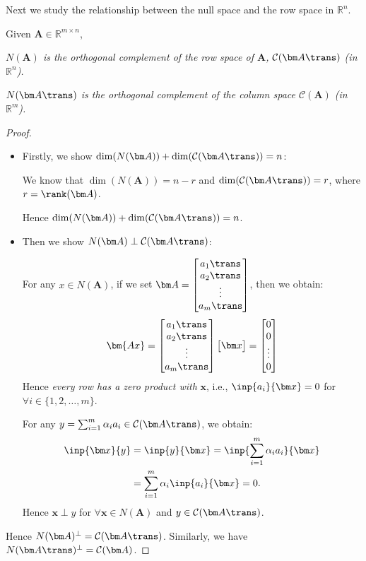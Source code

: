 Next we study the relationship between the null space and the row space in $\mathbb{R}^n$.
\begin{theorem} Given $\bm A\in\mathbb{R}^{m\times n}$,

\emph{$N(\bm A)$ is the orthogonal complement of the row space of $\bm A$, $\mathcal{C}(\bm A\trans)$ (in $\mathbb{R}^{n}$).}

\emph{$N(\bm A\trans)$ is the orthogonal complement of the column space $\mathcal{C}(\bm A)$ (in $\mathbb{R}^{m}$).}
\end{theorem}
\begin{proof}
\begin{itemize}
\item
Firstly, we show $\dim(N(\bm A))+\dim(\mathcal{C}(\bm A\trans))=n$:

We know that $\dim(N(\bm A))=n-r$ and $\dim(\mathcal{C}(\bm A\trans)) = r$, where $r=\rank(\bm A)$.

Hence $\dim(N(\bm A))+\dim(\mathcal{C}(\bm A\trans))=n$.
\item
Then we show $N(\bm A)\perp \mathcal{C}(\bm A\trans)$:

For any $x\in N(\bm A)$, if we set $\bm A=\begin{bmatrix}
a_1\trans\\a_2\trans\\\vdots\\a_m\trans
\end{bmatrix}$, then we obtain:
\[
\bm{Ax}=\begin{bmatrix}
a_1\trans\\a_2\trans\\\vdots\\a_m\trans
\end{bmatrix}\begin{bmatrix}
\bm x
\end{bmatrix}=\begin{bmatrix}
0\\0\\\vdots\\0
\end{bmatrix}
\]
Hence \textit{every row has a zero product with} $\bm x$, i.e., $\inp{a_i}{\bm x}=0$ for $\forall i\in\{1,2,\dots,m\}$.

For any $y=\sum_{i=1}^m\alpha_ia_i\in \mathcal{C}	(\bm A\trans)$, we obtain:
\[
\begin{aligned}
\inp{\bm x}{y}&=\inp{y}{\bm x}=\inp{\sum_{i=1}^m\alpha_ia_i}{\bm x}\\
&=\sum_{i=1}^{m}\alpha_i\inp{a_i}{\bm x}=0.
\end{aligned}
\]
Hence $\bm x\perp y$ for $\forall \bm x\in N(\bm A)$ and $y\in \mathcal{C}(\bm A\trans)$.\\
\end{itemize}
Hence $N(\bm A)^{\perp}=\mathcal{C}(\bm A\trans)$. Similarly, we have $N(\bm A\trans)^{\perp}=\mathcal{C}(\bm A)$. 
\end{proof}

